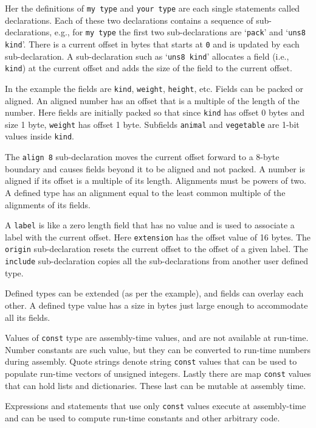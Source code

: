 \documentclass[12pt]{article}
\begin{document}
Her the definitions of {\tt my type} and {\tt your type} are each
single statements called declarations.  Each of these two
declarations contains a sequence of sub-declarations, e.g.,
for {\tt my type} the first two sub-declarations are
`{\tt pack}' and `{\tt uns8 kind}'.  There is a current
offset in bytes that starts at {\tt 0} and is updated by each sub-declaration.
A sub-declaration such as `{\tt uns8 kind}' allocates a field
(i.e., {\tt kind})
at the current offset and adds the size of the field to the
current offset.

In the example the fields are {\tt kind}, {\tt weight}, {\tt height}, etc.
Fields can be packed or aligned.  An aligned number has an offset
that is a multiple of the length of the number.
Here fields are initially packed
so that since {\tt kind} has offset 0 bytes and size 1 byte,
{\tt weight} has offset 1 byte.  Subfields {\tt animal}
and {\tt vegetable} are 1-bit values inside {\tt kind}.

The {\tt align 8} sub-declaration moves the current offset
forward to a 8-byte boundary and causes fields beyond it
to be aligned and not packed.  A number is aligned if
its offset is a multiple of its length.  Alignments must be powers of two.
A defined type has an
alignment equal to the least common multiple of the
alignments of its fields.

A {\tt label} is like a zero length field that has no value and
is used to associate a label with the current offset.
Here {\tt extension} has the offset value of 16 bytes.
The {\tt origin} sub-declaration resets the current offset to the offset
of a given label.
The {\tt include} sub-declaration copies all the sub-declarations
from another user defined type.

Defined types can be extended
(as per the example), and fields can overlay each other.
A defined type value has a size in bytes just large enough to
accommodate all its fields.

Values of {\tt const} type are assembly-time values, and are
not available at run-time.  Number constants are such value,
but they can be converted to run-time numbers during assembly.
Quote strings denote string {\tt const} values that can be
used to populate run-time vectors of unsigned integers.
Lastly there are map {\tt const} values that can hold lists
and dictionaries.  These last can be mutable at assembly time.

Expressions and statements that use only {\tt const} values
execute at assembly-time and can be used to compute run-time
constants and other arbitrary code.
\end{document}
